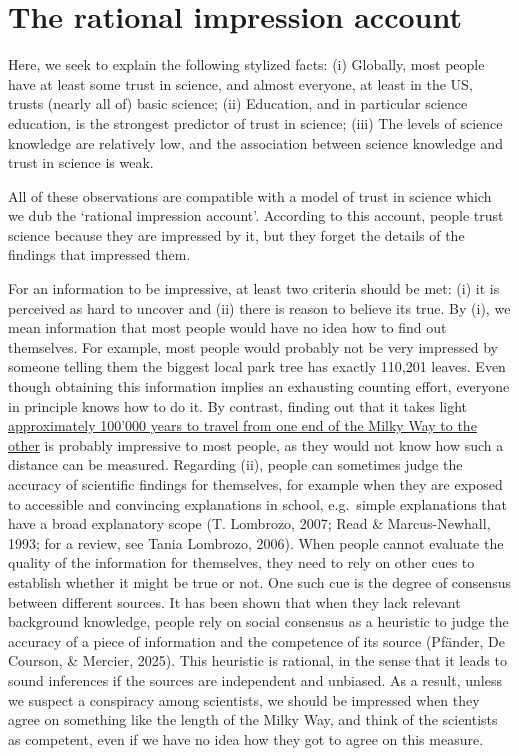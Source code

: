 \documentclass[
  doc,floatsintext]{apa6}
\begin{document}
\section{The rational impression account}\label{the-rational-impression-account}

Here, we seek to explain the following stylized facts: (i) Globally, most people have at least some trust in science, and almost everyone, at least in the US, trusts (nearly all of) basic science; (ii) Education, and in particular science education, is the strongest predictor of trust in science; (iii) The levels of science knowledge are relatively low, and the association between science knowledge and trust in science is weak.

All of these observations are compatible with a model of trust in science which we dub the `rational impression account'. According to this account, people trust science because they are impressed by it, but they forget the details of the findings that impressed them.

For an information to be impressive, at least two criteria should be met: (i) it is perceived as hard to uncover and (ii) there is reason to believe its true. By (i), we mean information that most people would have no idea how to find out themselves. For example, most people would probably not be very impressed by someone telling them the biggest local park tree has exactly 110,201 leaves. Even though obtaining this information implies an exhausting counting effort, everyone in principle knows how to do it. By contrast, finding out that it takes light \href{https://imagine.gsfc.nasa.gov/features/cosmic/milkyway_info.html}{approximately 100'000 years to travel from one end of the Milky Way to the other} is probably impressive to most people, as they would not know how such a distance can be measured. Regarding (ii), people can sometimes judge the accuracy of scientific findings for themselves, for example when they are exposed to accessible and convincing explanations in school, e.g.~simple explanations that have a broad explanatory scope (T. Lombrozo, 2007; Read \& Marcus-Newhall, 1993; for a review, see Tania Lombrozo, 2006). When people cannot evaluate the quality of the information for themselves, they need to rely on other cues to establish whether it might be true or not. One such cue is the degree of consensus between different sources. It has been shown that when they lack relevant background knowledge, people rely on social consensus as a heuristic to judge the accuracy of a piece of information and the competence of its source (Pfänder, De Courson, \& Mercier, 2025). This heuristic is rational, in the sense that it leads to sound inferences if the sources are independent and unbiased. As a result, unless we suspect a conspiracy among scientists, we should be impressed when they agree on something like the length of the Milky Way, and think of the scientists as competent, even if we have no idea how they got to agree on this measure.
\end{document}
